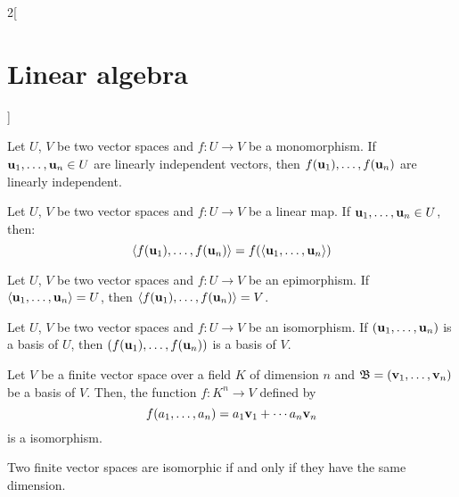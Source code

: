 \documentclass[../../../main.tex]{subfiles}
\begin{document}
\begin{multicols}{2}[\section{Linear algebra}]
\begin{definition}
    \end{definition}
    \begin{prop}
        Let $U$, $V$ be two vector spaces and $f:U\rightarrow V$ be a monomorphism. If $\boldsymbol{\mathrm{u}}_1,\ldots,\boldsymbol{\mathrm{u}}_n\in U$ are linearly independent vectors, then $f(\boldsymbol{\mathrm{u}}_1),\ldots,f(\boldsymbol{\mathrm{u}}_n)$  are linearly independent.
    \end{prop}
    \begin{lemma}
        Let $U$, $V$ be two vector spaces and $f:U\rightarrow V$ be a linear map. If $\boldsymbol{\mathrm{u}}_1,\ldots,\boldsymbol{\mathrm{u}}_n\in U$, then: $$\langle f(\boldsymbol{\mathrm{u}}_1),\ldots,f(\boldsymbol{\mathrm{u}}_n)\rangle=f(\langle\boldsymbol{\mathrm{u}}_1,\ldots,\boldsymbol{\mathrm{u}}_n\rangle)$$
    \end{lemma}
    \begin{corollary}
        Let $U$, $V$ be two vector spaces and $f:U\rightarrow V$ be an epimorphism. If $\langle\boldsymbol{\mathrm{u}}_1,\ldots,\boldsymbol{\mathrm{u}}_n\rangle= U$, then $\langle f(\boldsymbol{\mathrm{u}}_1),\ldots,f(\boldsymbol{\mathrm{u}}_n)\rangle=V$.
    \end{corollary}
    \begin{corollary}
        Let $U$, $V$ be two vector spaces and $f:U\rightarrow V$ be an isomorphism. If $(\boldsymbol{\mathrm{u}}_1,\ldots,\boldsymbol{\mathrm{u}}_n)$ is a basis of $U$, then $(f(\boldsymbol{\mathrm{u}}_1),\ldots,f(\boldsymbol{\mathrm{u}}_n))$ is a basis of $V$.
    \end{corollary}
    \begin{theorem}
        Let $V$ be a finite vector space over a field $K$ of dimension $n$ and $\mathfrak{B}=(\boldsymbol{\mathrm{v}}_1,\ldots,\boldsymbol{\mathrm{v}}_n)$ be a basis of $V$. Then, the function $f:K^n\rightarrow V$ defined by $$f(a_1,\ldots,a_n)=a_1\boldsymbol{\mathrm{v}}_1+\cdots a_n\boldsymbol{\mathrm{v}}_n$$ is a isomorphism.
    \end{theorem}
    \begin{corollary}
        Two finite vector spaces are isomorphic if and only if they have the same dimension.
    \end{corollary}

\end{multicols}
\end{document}
